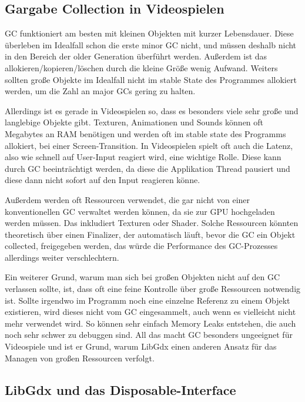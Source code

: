 \subsection{Gargabe Collection in Videospielen}

GC funktioniert am besten mit kleinen Objekten mit kurzer Lebensdauer.
Diese überleben im Idealfall schon die erste minor GC nicht, und müssen deshalb nicht in den Bereich der older
Generation überführt werden.
Außerdem ist das allokieren/kopieren/löschen durch die kleine Größe wenig Aufwand.
Weiters sollten große Objekte im Idealfall nicht im stable State des Programmes allokiert werden, um die Zahl an major
GCs gering zu halten.\cite{infoqJavaPerformance}

Allerdings ist es gerade in Videospielen so, dass es besonders viele sehr große und langlebige Objekte gibt.
Texturen, Animationen und Sounds können oft Megabytes an RAM benötigen und werden oft im stable state des Programms
allokiert, \zB bei einer Screen-Transition.
In Videospielen spielt oft auch die Latenz, also wie schnell auf User-Input reagiert wird, eine wichtige Rolle.
Diese kann durch GC beeinträchtigt werden, da diese die Applikation Thread pausiert und diese dann nicht sofort auf
den Input reagieren könne.

Außerdem werden oft Ressourcen verwendet, die gar nicht von einer konventionellen GC verwaltet werden können, da sie zur
GPU hochgeladen werden müssen.
Das inkludiert \zB Texturen oder Shader.
Solche Ressourcen könnten theoretisch über einen Finalizer, der automatisch läuft, bevor die GC ein Objekt collected,
freigegeben werden, das würde die Performance des GC-Prozesses allerdings weiter verschlechtern.\cite{infoqJavaPerformance}

Ein weiterer Grund, warum man sich bei großen Objekten nicht auf den GC verlassen sollte, ist, dass oft eine feine
Kontrolle über große Ressourcen notwendig ist.
Sollte irgendwo im Programm noch eine einzelne Referenz zu einem Objekt existieren, wird dieses nicht vom GC
eingesammelt, auch wenn es vielleicht nicht mehr verwendet wird.
So können sehr einfach Memory Leaks entstehen, die auch noch sehr schwer zu debuggen sind.
All das macht GC besonders ungeeignet für Videospiele und ist er Grund, warum LibGdx einen anderen Ansatz für das
Managen von großen Ressourcen verfolgt.

\subsection{LibGdx und das Disposable-Interface}

